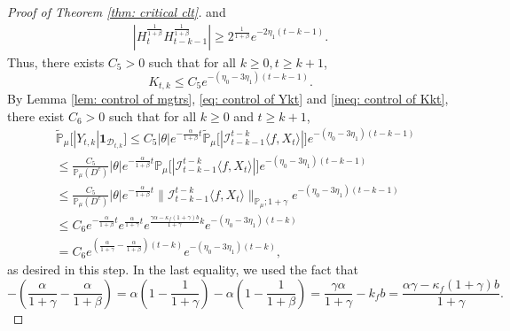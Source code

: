 \documentclass[12pt,a4paper]{amsart}
\theoremstyle{plain}
\theoremstyle{definition}
\numberwithin{equation}{section}
\begin{document}
\begin{proof}[Proof of Theorem \ref{thm: critical clt}]
  and
  \begin{align}
    |H_t^{\frac{1}{1+\beta}}H_{t-k-1}^{\frac{1}{1+\beta}}|
    \geq 2^{\frac{1}{1+\beta}} e^{-2\eta_1(t-k-1)}.
  \end{align}
  Thus, there exists  $C_5> 0$ such that for all $k \geq 0, t\geq k+1$,
  \begin{equation}
    \label{ineq: control of Kkt}
    K_{t,k}
    \leq C_5 e^{-(\eta_0 - 3\eta_1)(t-k-1)}.
  \end{equation}
  By Lemma \ref{lem: control of mgtrs}, \eqref{eq: control of Ykt} and \eqref{ineq: control of Kkt}, there exist $C_6>0$ such that for all $k\geq 0$ and $t\geq k+1$,
  \begin{align}
    \label{eq: Y in D}
    & \mathbb{\widetilde{P}}_{\mu}\big[|Y_{t,k}|\mathbf{1}_{\mathcal{D}_{t,k}}\big]
    \leq C_5 | \theta | e^{-\frac{\alpha}{1+\beta}t} \mathbb{\widetilde{P}}_{\mu} \big[ | \mathcal{I}_{t-k-1}^{t-k}\langle f, X_t\rangle| \big] e^{-(\eta_0 - 3\eta_1)(t-k-1)} \\
    & \leq  \frac{C_5} {\mathbb{P}_{\mu}(D^c)} | \theta | e^{-\frac{\alpha} {1+\beta}t}\mathbb{P}_{\mu} \big[ |\mathcal{I}_{t-k-1}^{t-k}\langle f, X_t\rangle|\big]e^{-(\eta_0 - 3\eta_1)(t-k-1)} \\
    & \leq \frac{C_5} {\mathbb{P}_{\mu}(D^c)} | \theta | e^{ - \frac{\alpha} {1 + \beta} t} \|\mathcal{I}_{t-k-1}^{t-k}\langle f,X_t\rangle\|_{\mathbb P_\mu; 1+\gamma} e^{-(\eta_0 - 3\eta_1)(t-k - 1)} \\
    & \leq C_6 e^{-\frac{\alpha}{1+\beta}t}e^{\frac{\alpha}{1+\gamma}t}e^{\frac{\gamma \alpha-\kappa_f(1+\gamma)b}{1+\gamma}k}e^{-(\eta_0 - 3\eta_1)(t-k)} \\
    & = C_6 e^{(\frac{\alpha}{1+\gamma}-\frac{\alpha}{1+\beta})(t-k)}e^{-(\eta_0 - 3\eta_1)(t-k)},
  \end{align}
  as desired in this step.
  In the last equality, we used the fact that
  \[
    -(\frac{\alpha}{1+\gamma}-\frac{\alpha}{1+\beta})
    = \alpha(1-\frac{1}{1+\gamma}) - \alpha(1-\frac{1}{1+\beta})
    = \frac{\gamma \alpha}{1+\gamma} - k_f b
    =\frac{\alpha \gamma-\kappa_f(1+\gamma)b}{1+\gamma}.
  \]
  

\end{proof}
\end{document}
